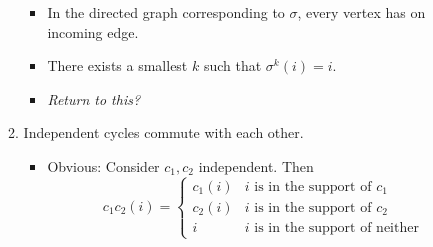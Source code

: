 \documentclass[../main.tex]{subfiles}
\begin{document}
\begin{itemize}
\begin{enumerate}
\begin{itemize}
            \item In the directed graph corresponding to $\sigma$, every vertex has on incoming edge.
            \item There exists a smallest $k$ such that $\sigma^k(i)=i$.
            \item \emph{Return to this?}
        \end{itemize}
        \item Independent cycles commute with each other.
        \begin{itemize}
            \item Obvious: Consider $c_1,c_2$ independent. Then
            \begin{equation*}
                c_1c_2(i) =
                \begin{cases}
                    c_1(i) & i\text{ is in the support of }c_1\\
                    c_2(i) & i\text{ is in the support of }c_2\\
                    i      & i\text{ is in the support of neither}
                \end{cases}
            \end{equation*}
        \end{itemize}
    \end{enumerate}
\end{itemize}
\end{document}
